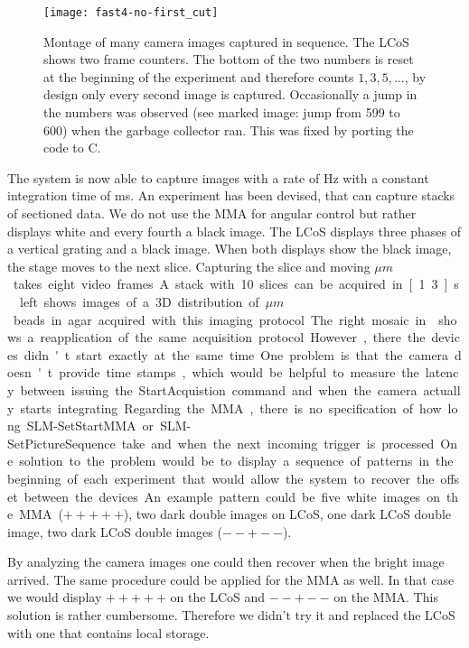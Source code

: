 \begin{figure}[!hbt]
  \centering
  \texttt{[image: fast4-no-first\_cut]}
  \caption{Montage of many camera images captured in sequence. The
    LCoS shows two frame counters. The bottom of the two numbers is
    reset at the beginning of the experiment and therefore counts
    $1,3,5,\ldots$, by design only every second image is
    captured. Occasionally a jump in the numbers was observed (see
    marked image: jump from 599 to 600) when the garbage collector
    ran. This was fixed by porting the code to C.}
  \label{fig:fast4-no-first_cut}
\end{figure}

The system is now able to capture images with a rate of \unit[30]{Hz}
with a constant integration time of \unit[16]{ms}.  An experiment has
been devised, that can capture stacks of sectioned data. We do not use
the MMA for angular control but rather displays white and every fourth
a black image. The LCoS displays three phases of a vertical grating
and a black image. When both displays show the black image, the stage
moves to the next slice. Capturing the slice and moving \unit[1]{$\mu
  m$} takes eight video frames. A stack with 10 slices can be acquired
in \unit[1.3]{s}. ~left shows images of a 3D
distribution of \unit[2]{$\mu m$} beads in agar acquired with this
imaging protocol.

The right mosaic in  shows a reapplication of
the same acquisition protocol. However, there the devices didn't start
exactly at the same time.

One problem is that the camera doesn't provide time stamps, which
would be helpful to measure the latency between issuing the
\textsf{StartAcquistion} command and when the camera actually starts
integrating.  Regarding the MMA, there is no specification of how long
\textsf{SLM-SetStartMMA} or \textsf{SLM-SetPictureSequence} take and
when the next incoming trigger is processed.

One solution to the problem would be to display a sequence of patterns
in the beginning of each experiment that would allow the system to
recover the offset between the devices. An example pattern could be
five white images on the MMA ($+++++$), two dark double images on
LCoS, one dark LCoS double image, two dark LCoS double images ($--+--$).

By analyzing the camera images one could then recover when the bright
image arrived. The same procedure could be applied for the MMA as
well. In that case we would display $+++++$ on the LCoS and $--+--$ on
the MMA. This solution is rather cumbersome. Therefore we didn't try
it and replaced the LCoS with one that contains local storage.


